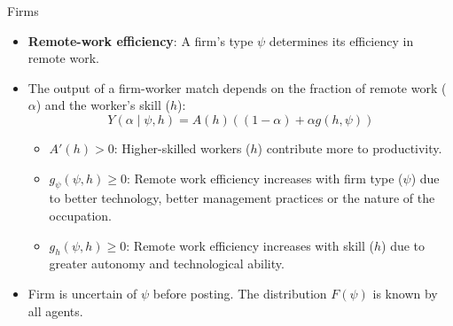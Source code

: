\documentclass[aspectratio=1610]{beamer}
\begin{document}
\begin{frame}{Firms}
    \begin{itemize}
        \item \textbf{Remote-work efficiency}: A firm’s type $\psi$ determines its efficiency in remote work.  \pause \vspace{0.3cm}
        \item The output of a firm-worker match depends on the fraction of remote work ($\alpha$) and the worker's skill ($h$):  $$Y(\alpha \mid \psi, h) = A(h)\left((1 - \alpha) + \alpha g(h,\psi)\right)$$ \pause 
        \begin{itemize}
            \item $A'(h) > 0$: Higher-skilled workers ($h$) contribute more to productivity.
            \item $g_{\psi}(\psi, h) \geq 0$: Remote work efficiency increases with firm type ($\psi$) due to better technology, better management practices or the nature of the occupation.
            \item $g_{h}(\psi, h) \geq 0$: Remote work efficiency increases with skill ($h$) due to greater autonomy and technological ability.
        \end{itemize}\pause
        \item Firm is uncertain of $\psi$ before posting. The distribution $F(\psi)$ is known by all agents.
    \end{itemize}
    
\end{frame}
\end{document}
